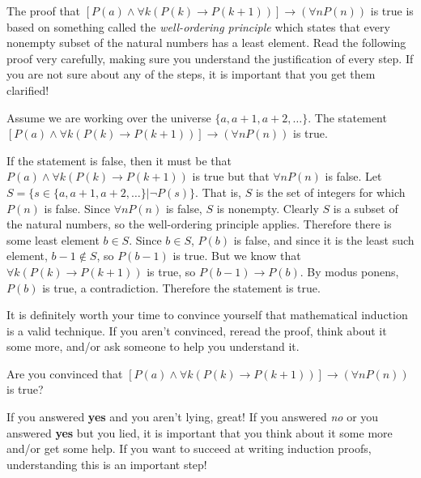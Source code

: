 The proof that $[P(a)\wedge\forall k(P(k)\rightarrow P(k+1))]\rightarrow (\forall n P(n))$ is true is based on something called the 
{\em well-ordering principle} which states that
every nonempty subset of the natural numbers has a least element.
Read the following proof very carefully, making sure you 
understand the justification of every step. If you are not sure about
any of the steps, it is important that you get them clarified!

\begin{thm}
Assume we are working over the universe $\{a, a+1, a+2, \ldots\}$.
The statement $[P(a)\wedge\forall k(P(k)\rightarrow P(k+1))]\rightarrow (\forall n P(n))$ is true.
\begin{pf}
If the statement is false, then it must be that
$P(a)\wedge\forall k(P(k)\rightarrow P(k+1))$
is true but that $\forall n P(n)$ is false.
Let $S=\{s\in \{a, a+1, a+2, \ldots\} | \neg P(s)\}$.
That is, $S$ is the set of integers for which $P(n)$ is false.
Since $\forall n P(n)$ is false, $S$ is nonempty.
Clearly $S$ is a subset of the natural numbers, so the well-ordering principle applies. Therefore there is some least element $b\in S$.
Since $b\in S$, $P(b)$ is false, and since it is the
least such element, $b-1\not\in S$, so $P(b-1)$ is true. 
But we know that $\forall k(P(k)\rightarrow P(k+1))$ is true, so
$P(b-1)\rightarrow P(b)$.
By modus ponens, $P(b)$ is true, a contradiction.
Therefore the statement is true.
\end{pf}
\end{thm}

It is definitely worth your time to convince yourself that
mathematical induction is a valid technique.
If you aren't convinced, reread the proof, think about it some more, 
and/or ask someone to help you understand it.

\begin{ques}
Are you convinced that $[P(a)\wedge\forall k(P(k)\rightarrow P(k+1))]\rightarrow (\forall n P(n))$ is true?

\noindent
\answerline
\begin{answer}
If you answered {\bf yes} and you aren't lying, great!  If you
answered {\em no} or you answered {\bf yes} but you lied, 
it is important that you think about it some more and/or
get some help.  If you want to succeed at writing induction
proofs, understanding this is an important step!
\end{answer}
\end{ques}


